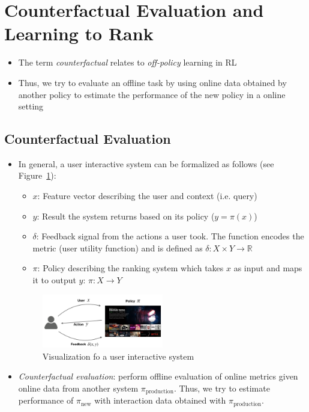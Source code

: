 \section{Counterfactual Evaluation and Learning to Rank}
\begin{itemize}
	\item The term \textit{counterfactual} relates to \textit{off-policy} learning in RL
	\item Thus, we try to evaluate an offline task by using online data obtained by another policy to estimate the performance of the new policy in a online setting
\end{itemize}
\subsection{Counterfactual Evaluation}
\begin{itemize}
	\item In general, a user interactive system can be formalized as follows (see Figure~\ref{img:counterfactual_user_interactive_system}):
	\begin{itemize}
		\item $x$: Feature vector describing the user and context (i.e. query)
		\item $y$: Result the system returns based on its policy ($y=\pi(x)$)
		\item $\delta$: Feedback signal from the actions a user took. The function encodes the metric (user utility function) and is defined as $\delta: X\times Y\to \mathbb{R}$
		\item $\pi$: Policy describing the ranking system which takes $x$ as input and maps it to output $y$: $\pi:X\to Y$
	\end{itemize}
	\begin{figure}[ht]
		\centering
		\includegraphics[width=0.5\textwidth]{figures/counterfactual_user_interactive_system.png}
		\caption{Visualization fo a user interactive system}
		\label{img:counterfactual_user_interactive_system}
	\end{figure}
	\item \textit{Counterfactual evaluation}: perform offline evaluation of online metrics given online data from another system $\pi_{\text{production}}$. Thus, we try to estimate performance of $\pi_{\text{new}}$ with interaction data obtained with $\pi_{\text{production}}$.

\end{itemize}

